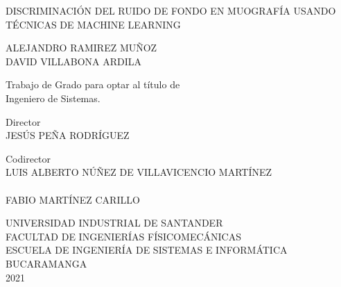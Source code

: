 \begin{center}

DISCRIMINACIÓN DEL RUIDO DE FONDO EN MUOGRAFÍA USANDO TÉCNICAS DE MACHINE LEARNING \vspace{1cm}

ALEJANDRO RAMIREZ MUÑOZ\\DAVID VILLABONA ARDILA\\
\vspace{1cm}

Trabajo de Grado para optar al título de\\
Ingeniero de Sistemas.\\\vspace{1cm}

Director\\
JESÚS PEÑA RODRÍGUEZ\\

\vspace{1cm}

Codirector\\
LUIS ALBERTO NÚÑEZ DE VILLAVICENCIO MARTÍNEZ\\
\\FABIO MARTÍNEZ CARILLO\\
\vspace{1cm}


UNIVERSIDAD INDUSTRIAL DE SANTANDER\\
FACULTAD DE INGENIERÍAS FÍSICOMECÁNICAS\\
ESCUELA DE INGENIERÍA DE SISTEMAS E INFORMÁTICA\\
BUCARAMANGA\\
2021\\

\end{center}





